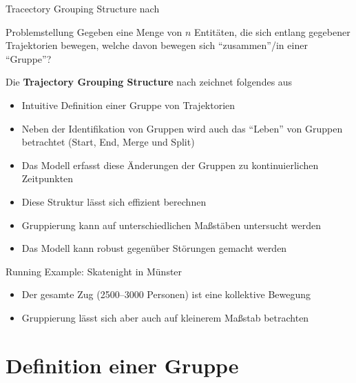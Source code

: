 \documentclass[
wide,
10pt,
xcolor={x11names,svgnames},
hyperref={pdfauthor={Jannes Bantje},colorlinks,urlcolor=maincolor,hidelinks=false,linkcolor=maincolor},
pantone312, 	%
euler-digits,
]{beamer}
\newcommand{\bet}[1]{\textbf{\color{maincolor}#1}}
\theoremstyle{definition}
\begin{document}
\begin{frame}{Tracectory Grouping Structure nach \textcite{buchin2015}}
    \begin{block}{Problemstellung}
        Gegeben eine Menge von $n$ Entitäten, die sich entlang gegebener Trajektorien bewegen, welche davon bewegen sich \enquote{zusammen}/in einer \enquote{Gruppe}?
    \end{block}
    Die \bet{Trajectory Grouping Structure} nach \textcite{buchin2015} zeichnet folgendes aus
    \begin{itemize}
        \item Intuitive Definition einer Gruppe von Trajektorien
        \item Neben der Identifikation von Gruppen wird auch das \enquote{Leben} von Gruppen betrachtet (Start, End, Merge und Split)
        \item Das Modell erfasst diese Änderungen der Gruppen zu kontinuierlichen Zeitpunkten
        \item Diese Struktur lässt sich effizient berechnen
        \item Gruppierung kann auf unterschiedlichen Maßstäben untersucht werden
        \item Das Modell kann robust gegenüber Störungen gemacht werden
    \end{itemize}
\end{frame}

\begin{frame}{Running Example: Skatenight in Münster}
    \begin{itemize}
        \item Der gesamte Zug (2500--3000 Personen) ist eine kollektive Bewegung
        \item Gruppierung lässt sich aber auch auf kleinerem Maßstab betrachten
    \end{itemize}
\end{frame}

\section{Definition einer Gruppe}
\end{document}
